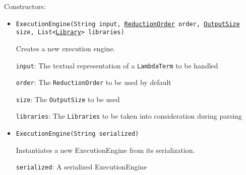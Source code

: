 Constructors:
\begin{itemize}
\item \texttt{ExecutionEngine(String input, \hyperref[type:edu.kit.wavelength.client.model.reduction.ReductionOrder]{ReductionOrder} order, \hyperref[type:edu.kit.wavelength.client.model.output.OutputSize]{OutputSize} size, List<\hyperref[type:edu.kit.wavelength.client.model.library.Library]{Library}> libraries)}

Creates a new execution engine.

\texttt{input}: The textual representation of a \texttt{LambdaTerm} to be handled

\texttt{order}: The \texttt{ReductionOrder} to be used by default

\texttt{size}: The \texttt{OutputSize} to be used

\texttt{libraries}: The \texttt{Libraries} to be taken into consideration during
            parsing

\item \texttt{ExecutionEngine(String serialized)}

Instantiates a new ExecutionEngine from its serialization.

\texttt{serialized}: A serialized ExecutionEngine

\end{itemize}

